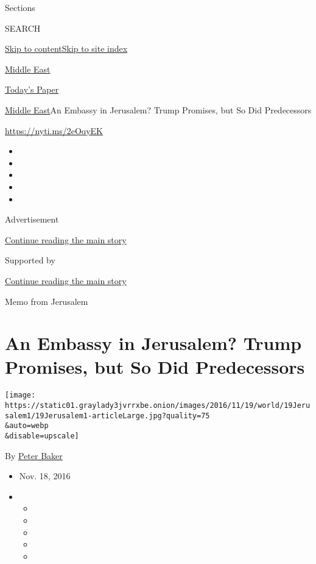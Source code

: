 Sections

SEARCH

\protect\hyperlink{site-content}{Skip to
content}\protect\hyperlink{site-index}{Skip to site index}

\href{https://www.nytimes3xbfgragh.onion/section/world/middleeast}{Middle
East}

\href{https://myaccount.nytimes3xbfgragh.onion/auth/login?response_type=cookie\&client_id=vi}{}

\href{https://www.nytimes3xbfgragh.onion/section/todayspaper}{Today's
Paper}

\href{/section/world/middleeast}{Middle East}\textbar{}An Embassy in
Jerusalem? Trump Promises, but So Did Predecessors

\url{https://nyti.ms/2eOqyEK}

\begin{itemize}
\item
\item
\item
\item
\item
\end{itemize}

Advertisement

\protect\hyperlink{after-top}{Continue reading the main story}

Supported by

\protect\hyperlink{after-sponsor}{Continue reading the main story}

Memo from Jerusalem

\hypertarget{an-embassy-in-jerusalem-trump-promises-but-so-did-predecessors}{%
\section{An Embassy in Jerusalem? Trump Promises, but So Did
Predecessors}\label{an-embassy-in-jerusalem-trump-promises-but-so-did-predecessors}}

\texttt{[image: https://static01.graylady3jvrrxbe.onion/images/2016/11/19/world/19Jerusalem1/19Jerusalem1-articleLarge.jpg?quality=75\\\&auto=webp\\\&disable=upscale]}

By \href{http://www.nytimes3xbfgragh.onion/by/peter-baker}{Peter Baker}

\begin{itemize}
\item
  Nov. 18, 2016
\item
  \begin{itemize}
  \item
  \item
  \item
  \item
  \item
  \end{itemize}
\end{itemize}

